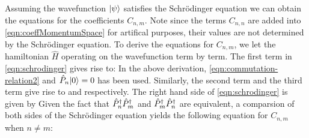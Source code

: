 Assuming the wavefunction $| \psi \rangle$ satisfies the Schr{\" o}dinger equation
we can obtain the equations for the coefficients $C_{n, m}$. Note since the terms $C_{n, n}$ are added into
 \autoref{eqn:coeffMomentumSpace} for artifical purposes, their values are not determined by the Schr{\" o}dinger
 equation. To derive the equations for $C_{n, m}$, we let the hamiltonian $\hat{H}$ operating on the wavefunction
 term by term. The first term in \autoref{eqn:schrodinger} gives rise to:
In the above derivation, \autoref{eqn:commutation-relation2} and $\hat{P}_{n}| 0 \rangle = 0$ has been used. Similarly, the
 second term and the third term give rise to 
and
respectively. The right hand side of \autoref{eqn:schrodinger} is given by
Given the fact that $\hat{P}^{\dagger}_{n}\hat{P}^{\dagger}_{m}$ and $\hat{P}^{\dagger}_{m}\hat{P}^{\dagger}_{n}$ are equivalent, a comparsion of both sides of the
 Schr{\"o}dinger equation yields the following equation for $C_{n, m}$ when $n \neq m$:
